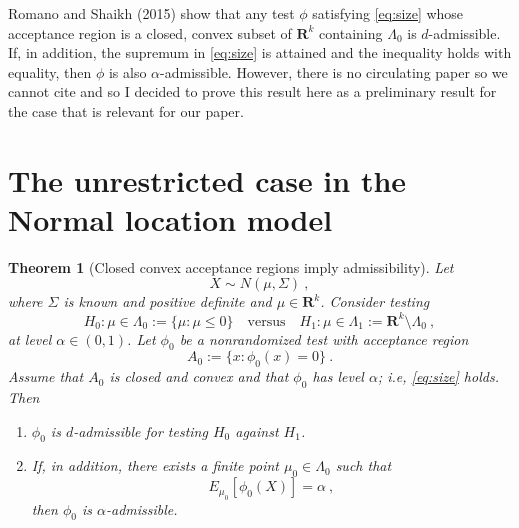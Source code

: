 \documentclass[12pt]{article}
\newtheorem{theorem}{Theorem}
\theoremstyle{definition}
\theoremstyle{remark}
\begin{document}
Romano and Shaikh (2015) show that any test $\phi$ satisfying \eqref{eq:size} whose acceptance region is a closed, convex subset of $\mathbf{R}^k$ containing $\Lambda_0$ is $d$-admissible.  If, in addition, the supremum in \eqref{eq:size} is attained and the inequality holds with equality, then $\phi$ is also $\alpha$-admissible. However, there is no circulating paper so we cannot cite and so I decided to prove this result here as a preliminary result for the case that is relevant for our paper. 

\newpage 

\section*{The unrestricted case in the Normal location model}

\begin{theorem}[Closed convex acceptance regions imply admissibility]
    Let
    \[
    X\sim N(\mu,\Sigma)~,
    \]
    where $\Sigma$ is known and positive definite and $\mu\in\mathbf R^k$. Consider testing
    \[
    H_0:\mu\in\Lambda_0:=\{\mu:\mu\le 0\}
    \quad\text{versus}\quad
    H_1:\mu\in\Lambda_1:=\mathbf R^k\setminus\Lambda_0~,
    \]
    at level $\alpha \in (0,1)$.    Let $\phi_0$ be a nonrandomized test with acceptance region
    \[
    A_0:=\{x:\phi_0(x)=0\}~.
    \]
    Assume that $A_0$ is closed and convex and that $\phi_0$ has level $\alpha$; i.e, \eqref{eq:size} holds. Then 
    \begin{enumerate}
    \item $\phi_0$ is $d$-admissible for testing $H_0$ against $H_1$.
    \item If, in addition, there exists a finite point $\mu_0\in\Lambda_0$ such that
    \[
    E_{\mu_0}[\phi_0(X)]=\alpha~,
    \]
    then $\phi_0$ is $\alpha$-admissible.  
    \end{enumerate}
\end{theorem}
    
\end{document}
